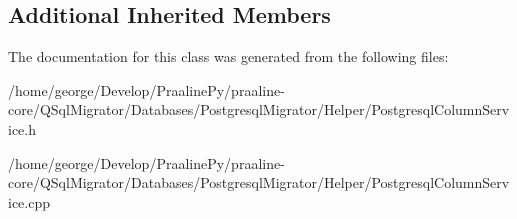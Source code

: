\subsection*{Additional Inherited Members}


The documentation for this class was generated from the following files\+:\begin{DoxyCompactItemize}
\item 
/home/george/\+Develop/\+Praaline\+Py/praaline-\/core/\+Q\+Sql\+Migrator/\+Databases/\+Postgresql\+Migrator/\+Helper/Postgresql\+Column\+Service.\+h\item 
/home/george/\+Develop/\+Praaline\+Py/praaline-\/core/\+Q\+Sql\+Migrator/\+Databases/\+Postgresql\+Migrator/\+Helper/Postgresql\+Column\+Service.\+cpp\end{DoxyCompactItemize}
